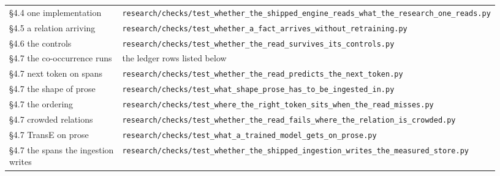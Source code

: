 \documentclass[10pt,letterpaper,twocolumn]{article}
\begin{document}
\begin{center}
{\begin{xtabular}{L{0.276\linewidth}L{0.655\linewidth}}
§4.4 one implementation & \texttt{research/\allowbreak{}checks/\allowbreak{}test\_\allowbreak{}whether\_\allowbreak{}the\_\allowbreak{}shipped\_\allowbreak{}engine\_\allowbreak{}reads\_\allowbreak{}what\_\allowbreak{}the\_\allowbreak{}research\_\allowbreak{}one\_\allowbreak{}reads.\allowbreak{}py} \\
§4.5 a relation arriving & \texttt{research/\allowbreak{}checks/\allowbreak{}test\_\allowbreak{}whether\_\allowbreak{}a\_\allowbreak{}fact\_\allowbreak{}arrives\_\allowbreak{}without\_\allowbreak{}retraining.\allowbreak{}py} \\
§4.6 the controls & \texttt{research/\allowbreak{}checks/\allowbreak{}test\_\allowbreak{}whether\_\allowbreak{}the\_\allowbreak{}read\_\allowbreak{}survives\_\allowbreak{}its\_\allowbreak{}controls.\allowbreak{}py} \\
§4.7 the co-occurrence runs & the ledger rows listed below \\
§4.7 next token on spans & \texttt{research/\allowbreak{}checks/\allowbreak{}test\_\allowbreak{}whether\_\allowbreak{}the\_\allowbreak{}read\_\allowbreak{}predicts\_\allowbreak{}the\_\allowbreak{}next\_\allowbreak{}token.\allowbreak{}py} \\
§4.7 the shape of prose & \texttt{research/\allowbreak{}checks/\allowbreak{}test\_\allowbreak{}what\_\allowbreak{}shape\_\allowbreak{}prose\_\allowbreak{}has\_\allowbreak{}to\_\allowbreak{}be\_\allowbreak{}ingested\_\allowbreak{}in.\allowbreak{}py} \\
§4.7 the ordering & \texttt{research/\allowbreak{}checks/\allowbreak{}test\_\allowbreak{}where\_\allowbreak{}the\_\allowbreak{}right\_\allowbreak{}token\_\allowbreak{}sits\_\allowbreak{}when\_\allowbreak{}the\_\allowbreak{}read\_\allowbreak{}misses.\allowbreak{}py} \\
§4.7 crowded relations & \texttt{research/\allowbreak{}checks/\allowbreak{}test\_\allowbreak{}whether\_\allowbreak{}the\_\allowbreak{}read\_\allowbreak{}fails\_\allowbreak{}where\_\allowbreak{}the\_\allowbreak{}relation\_\allowbreak{}is\_\allowbreak{}crowded.\allowbreak{}py} \\
§4.7 TransE on prose & \texttt{research/\allowbreak{}checks/\allowbreak{}test\_\allowbreak{}what\_\allowbreak{}a\_\allowbreak{}trained\_\allowbreak{}model\_\allowbreak{}gets\_\allowbreak{}on\_\allowbreak{}prose.\allowbreak{}py} \\
§4.7 the spans the ingestion writes & \texttt{research/\allowbreak{}checks/\allowbreak{}test\_\allowbreak{}whether\_\allowbreak{}the\_\allowbreak{}shipped\_\allowbreak{}ingestion\_\allowbreak{}writes\_\allowbreak{}the\_\allowbreak{}measured\_\allowbreak{}store.\allowbreak{}py} \\

\end{xtabular}}
\end{center}
\end{document}
